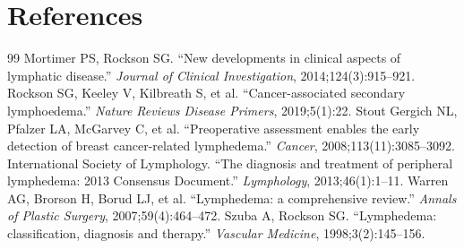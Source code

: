 \section*{References}
\begin{thebibliography}{99}
 Mortimer PS, Rockson SG. ``New developments in clinical aspects of lymphatic disease.'' \textit{Journal of Clinical Investigation}, 2014;124(3):915--921.
 Rockson SG, Keeley V, Kilbreath S, et al. ``Cancer-associated secondary lymphoedema.'' \textit{Nature Reviews Disease Primers}, 2019;5(1):22.
 Stout Gergich NL, Pfalzer LA, McGarvey C, et al. ``Preoperative assessment enables the early detection of breast cancer-related lymphedema.'' \textit{Cancer}, 2008;113(11):3085--3092.
 International Society of Lymphology. ``The diagnosis and treatment of peripheral lymphedema: 2013 Consensus Document.'' \textit{Lymphology}, 2013;46(1):1--11.
 Warren AG, Brorson H, Borud LJ, et al. ``Lymphedema: a comprehensive review.'' \textit{Annals of Plastic Surgery}, 2007;59(4):464--472.
 Szuba A, Rockson SG. ``Lymphedema: classification, diagnosis and therapy.'' \textit{Vascular Medicine}, 1998;3(2):145--156.

\end{thebibliography}
